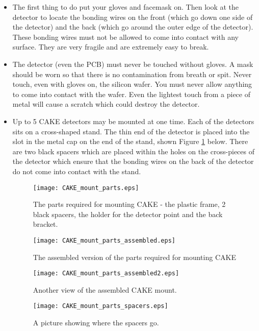 \documentclass[11pt]{report}
\begin{document}
\begin{itemize}

\item The first thing to do put your gloves and facemask on. Then look at the detector to locate the bonding wires on the front (which go down one side of the detector) and the back (which go around the outer edge of the detector). These bonding wires must not be allowed to come into contact with any surface. They are very fragile and are extremely easy to break.

\item The detector (even the PCB) must never be touched without gloves. A mask should be worn so that there is no contamination from breath or spit. Never touch, even with gloves on, the silicon wafer. You must never allow anything to come into contact with the wafer. Even the lightest touch from a piece of metal will cause a scratch which could destroy the detector.

\item Up to 5 CAKE detectors may be mounted at one time. Each of the detectors sits on a cross-shaped stand. The thin end of the detector is placed into the slot in the metal cap on the end of the stand, shown Figure \ref{fig:CAKE_mounting_stuff} below. There are two black spacers which are placed within the holes on the cross-pieces of the detector which ensure that the bonding wires on the back of the detector do not come into contact with the stand.

\begin{figure}
 \texttt{[image: CAKE\_mount\_parts.eps]}
 \caption{The parts required for mounting CAKE - the plastic frame, 2 black spacers, the holder for the detector point and the back bracket.}
 \label{fig:CAKE_mounting_stuff}
\end{figure}

\begin{figure}
 \texttt{[image: CAKE\_mount\_parts\_assembled.eps]}
 \caption{The assembled version of the parts required for mounting CAKE}
 \label{fig:CAKE_mounting_stuff_assembled}
\end{figure}

\begin{figure}
 \texttt{[image: CAKE\_mount\_parts\_assembled2.eps]}
 \caption{Another view of the assembled CAKE mount.}
 \label{fig:CAKE_mounting_stuff_assembled}
\end{figure}

\begin{figure}
 \texttt{[image: CAKE\_mount\_parts\_spacers.eps]}
 \caption{A picture showing where the spacers go.}
 \label{fig:CAKE_spacers}
\end{figure}




\end{itemize}
\end{document}
